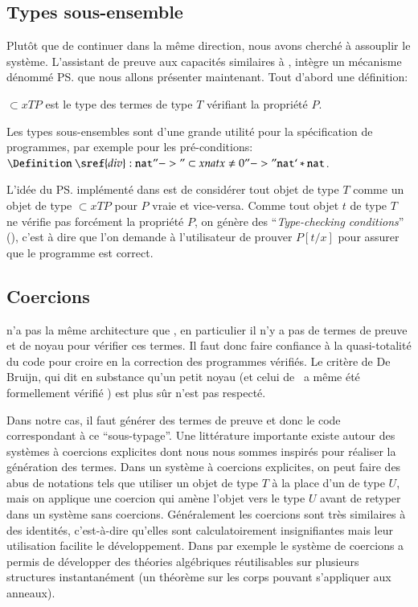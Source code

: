\subsection{Types sous-ensemble}
Plut\^ot que de continuer dans la m\^eme direction, nous avons 
cherch\'e \`a assouplir le syst\`eme. L'assistant de preuve \PVS{}
\cite{PVS-Semantics:TR} aux capacit\'es similaires \`a \Coq{}, int\`egre un
m\'ecanisme d\'enomm\'e \ps{} que nous allons pr\'esenter maintenant.
Tout d'abord une d\'efinition:
\begin{definition}
  $\subset{x}{T}{P}$ est le type des termes de type $T$ v\'erifiant la
  propri\'et\'e $P$.
\end{definition}

Les types sous-ensembles sont d'une grande utilit\'e pour la sp\'ecification
de programmes, par exemple pour les pr\'e-conditions:
$\Definition~\sref{div} : \nat "->" \subset{x}{nat}{x \neq 0} "->" \nat
`* \nat$.

L'id\'ee du \ps{} impl\'ement\'e dans \PVS{}
\cite{Shankar&Owre:WADT99,Rushby98:TSE} est de consid\'erer tout objet de
type $T$ comme un objet de type $\subset{x}{T}{P}$ pour $P$ vraie et
vice-versa. Comme tout objet $t$ de type $T$ ne v\'erifie pas forc\'ement la
propri\'et\'e $P$, on g\'en\`ere des ``\emph{Type-checking conditions}'' (\TCC), c'est
\`a dire que l'on demande \`a l'utilisateur de prouver $P[t/x]$ pour assurer
que le programme est correct.

\subsection{Coercions}
\PVS{} n'a pas la m\^eme architecture que \Coq{}, en particulier il n'y a
pas de termes de preuve et de noyau pour v\'erifier ces termes. Il faut
donc faire confiance \`a la quasi-totalit\'e du code pour croire en la
correction des programmes v\'erifi\'es. Le crit\`ere de {\sc De Bruijn},
qui dit en substance qu'un petit noyau (et celui de \Coq~a m\^eme \'et\'e
formellement v\'erifi\'e \cite{Barras96a}) est plus s\^ur n'est pas respect\'e.
 
Dans notre cas, il faut g\'en\'erer des termes de preuve et donc le code 
correspondant \`a ce ``sous-typage''. Une litt\'erature importante
\cite{conf/popl/Chen03,conf/csl/Luo96} existe
autour des syst\`emes \`a coercions explicites dont nous nous sommes
inspir\'es pour r\'ealiser la g\'en\'eration des termes. Dans un syst\`eme \`a
coercions explicites, on peut faire des abus de notations tels que
utiliser un objet de type $T$ \`a la place d'un de type $U$, mais
on applique une coercion qui am\`ene l'objet vers le type $U$ avant 
de retyper dans un syst\`eme sans coercions. G\'en\'eralement les coercions
sont tr\`es similaires \`a des identit\'es, c'est-\`a-dire qu'elles sont calculatoirement
insignifiantes mais leur utilisation facilite le d\'eveloppement. Dans
\Coq{} par exemple le syst\`eme de coercions \cite{saibi97inheritance} a
permis de d\'evelopper des th\'eories alg\'ebriques r\'eutilisables sur
plusieurs structures instantan\'ement (un th\'eor\`eme sur les corps pouvant s'appliquer aux
anneaux).

